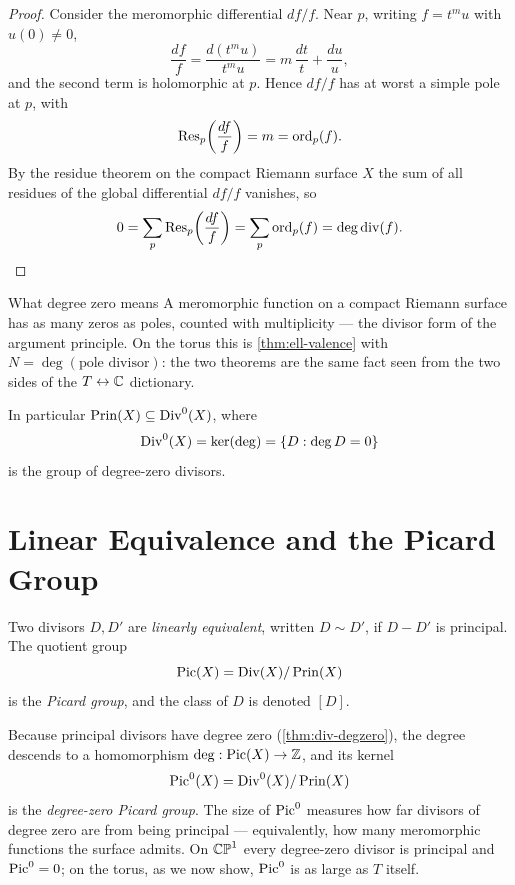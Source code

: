 \begin{proof}
Consider the meromorphic differential \(df/f\). Near \(p\), writing
\(f = t^{m} u\) with \(u(0) \ne 0\),
\[
  \frac{df}{f} = \frac{d(t^{m}u)}{t^{m}u}
  = m\,\frac{dt}{t} + \frac{du}{u},
\]
and the second term is holomorphic at \(p\). Hence \(df/f\) has at worst a simple
pole at \(p\), with
\[
  \operatorname{Res}_p\!\left( \frac{df}{f} \right) = m = \operatorname{ord}_p(f) .
\]
By the residue theorem on the compact Riemann surface \(X\) the sum of all
residues of the global differential \(df/f\) vanishes, so
\[
  0 = \sum_{p} \operatorname{Res}_p\!\left( \frac{df}{f} \right) = \sum_p \operatorname{ord}_p(f)
  = \operatorname{deg} \operatorname{div}(f) . \qedhere
\]
\end{proof}

\begin{keyidea}{What degree zero means}
A meromorphic function on a compact Riemann surface has as many zeros as poles,
counted with multiplicity --- the divisor form of the argument principle. On the
torus this is \cref{thm:ell-valence} with \(N = \deg(\text{pole divisor})\): the
two theorems are the same fact seen from the two sides of the
\(T \leftrightarrow \mathbb{C}\) dictionary.
\end{keyidea}

In particular \(\operatorname{Prin}(X) \subseteq \operatorname{Div}^0(X)\), where
\[
  \operatorname{Div}^0(X) = \ker(\operatorname{deg}) = \{ D : \operatorname{deg} D = 0 \}
\]
is the group of degree-zero divisors.

\section{Linear Equivalence and the Picard Group}
\label{sec:div-picard}

\begin{definition}
\label{def:div-lineq}
Two divisors \(D, D'\) are \emph{linearly equivalent}, written \(D \sim D'\), if
\(D - D'\) is principal. The quotient group
\[
  \operatorname{Pic}(X) = \operatorname{Div}(X)/\operatorname{Prin}(X)
\]
is the \emph{Picard group}, and the class of \(D\) is denoted \([D]\).
\end{definition}

Because principal divisors have degree zero (\cref{thm:div-degzero}), the degree
descends to a homomorphism \(\operatorname{deg} : \operatorname{Pic}(X) \to \mathbb{Z}\), and its kernel
\[
  \operatorname{Pic}^0(X) = \operatorname{Div}^0(X)/\operatorname{Prin}(X)
\]
is the \emph{degree-zero Picard group}. The size of \(\operatorname{Pic}^0\) measures how far
divisors of degree zero are from being principal --- equivalently, how many
meromorphic functions the surface admits. On \(\mathbb{CP}^1\) every degree-zero divisor
is principal and \(\operatorname{Pic}^0 = 0\); on the torus, as we now show, \(\operatorname{Pic}^0\) is as
large as \(T\) itself.

